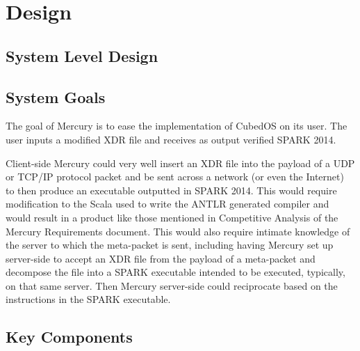 \section{Design}
\label{sec:mercury-design}

\subsection{System Level Design}

\subsection{System Goals}

The goal of Mercury is to ease the implementation of CubedOS on its user. The user inputs a
modified XDR file and receives as output verified SPARK 2014.

Client-side Mercury could very well insert an XDR file into the payload of a UDP or TCP/IP
protocol packet and be sent across a network (or even the Internet) to then produce an
executable outputted in SPARK 2014. This would require modification to the Scala used to write
the ANTLR generated compiler and would result in a product like those mentioned in Competitive
Analysis of the Mercury Requirements document. This would also require intimate knowledge of the
server to which the meta-packet is sent, including having Mercury set up server-side to accept
an XDR file from the payload of a meta-packet and decompose the file into a SPARK executable
intended to be executed, typically, on that same server. Then Mercury server-side could
reciprocate based on the instructions in the SPARK executable.

\subsection{Key Components}

